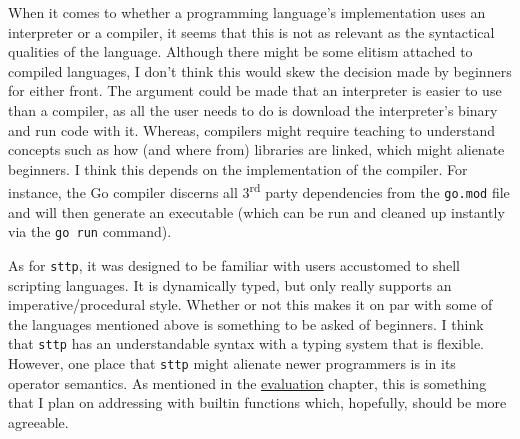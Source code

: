 When it comes to whether a programming language's implementation uses an interpreter or a compiler, it seems that this is not as relevant as the syntactical qualities of the language. Although there might be some elitism attached to compiled languages, I don't think this would skew the decision made by beginners for either front. The argument could be made that an interpreter is easier to use than a compiler, as all the user needs to do is download the interpreter's binary and run code with it. Whereas, compilers might require teaching to understand concepts such as how (and where from) libraries are linked, which might alienate beginners. I think this depends on the implementation of the compiler. For instance, the Go compiler discerns all 3\textsuperscript{rd} party dependencies from the \verb|go.mod| file and will then generate an executable (which can be run and cleaned up instantly via the \verb|go run| command).

As for \verb|sttp|, it was designed to be familiar with users accustomed to shell scripting languages. It is dynamically typed, but only really supports an imperative/procedural style. Whether or not this makes it on par with some of the languages mentioned above is something to be asked of beginners. I think that \verb|sttp| has an understandable syntax with a typing system that is flexible. However, one place that \verb|sttp| might alienate newer programmers is in its operator semantics. As mentioned in the \hyperref[chap:evaluation]{evaluation} chapter, this is something that I plan on addressing with builtin functions which, hopefully, should be more agreeable.
